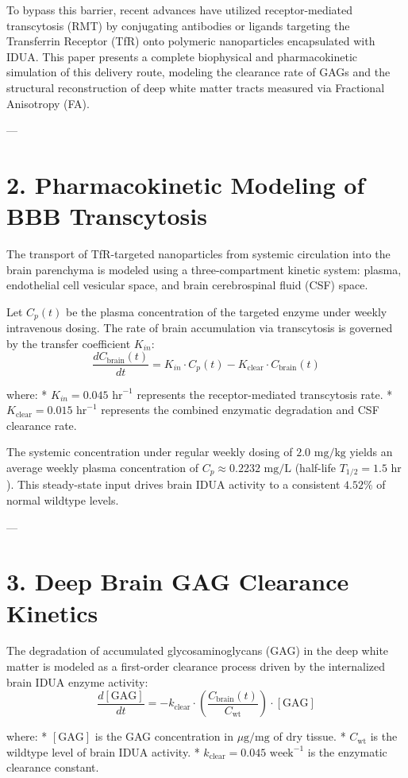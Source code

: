 \documentclass[11pt,twocolumn]{article}
\begin{document}
To bypass this barrier, recent advances have utilized receptor-mediated transcytosis (RMT) by conjugating antibodies or ligands targeting the Transferrin Receptor (TfR) onto polymeric nanoparticles encapsulated with IDUA. This paper presents a complete biophysical and pharmacokinetic simulation of this delivery route, modeling the clearance rate of GAGs and the structural reconstruction of deep white matter tracts measured via Fractional Anisotropy (FA).

---

\section{2. Pharmacokinetic Modeling of BBB Transcytosis}
The transport of TfR-targeted nanoparticles from systemic circulation into the brain parenchyma is modeled using a three-compartment kinetic system: plasma, endothelial cell vesicular space, and brain cerebrospinal fluid (CSF) space.

Let $C_p(t)$ be the plasma concentration of the targeted enzyme under weekly intravenous dosing. The rate of brain accumulation via transcytosis is governed by the transfer coefficient $K_{in}$:
$$\frac{dC_{\text{brain}}(t)}{dt} = K_{in} \cdot C_p(t) - K_{\text{clear}} \cdot C_{\text{brain}}(t)$$

where:
*   $K_{in} = 0.045 \text{ hr}^{-1}$ represents the receptor-mediated transcytosis rate.
*   $K_{\text{clear}} = 0.015 \text{ hr}^{-1}$ represents the combined enzymatic degradation and CSF clearance rate.

The systemic concentration under regular weekly dosing of $2.0\text{ mg/kg}$ yields an average weekly plasma concentration of $C_p \approx 0.2232\text{ mg/L}$ (half-life $T_{1/2} = 1.5\text{ hr}$). This steady-state input drives brain IDUA activity to a consistent $4.52\%$ of normal wildtype levels.

---

\section{3. Deep Brain GAG Clearance Kinetics}
The degradation of accumulated glycosaminoglycans (GAG) in the deep white matter is modeled as a first-order clearance process driven by the internalized brain IDUA enzyme activity:
$$\frac{d[\text{GAG}]}{dt} = -k_{\text{clear}} \cdot \left( \frac{C_{\text{brain}}(t)}{C_{\text{wt}}} \right) \cdot [\text{GAG}]$$

where:
*   $[\text{GAG}]$ is the GAG concentration in $\mu\text{g/mg}$ of dry tissue.
*   $C_{\text{wt}}$ is the wildtype level of brain IDUA activity.
*   $k_{\text{clear}} = 0.045 \text{ week}^{-1}$ is the enzymatic clearance constant.
\end{document}
